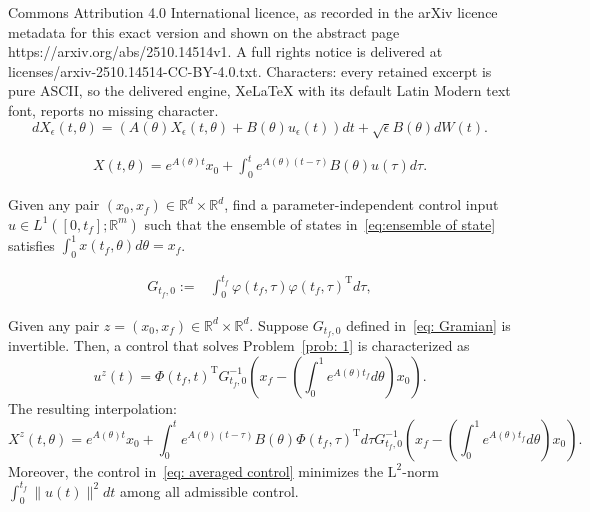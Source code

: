 \documentclass[10pt,a4paper]{amsart}
\newcommand{\R}{\mathbb{R}}
\begin{document}
Commons Attribution 4.0 International licence, as recorded in the arXiv licence metadata for this exact version and shown on the abstract page https://arxiv.org/abs/2510.14514v1. A full rights notice is delivered at licenses/arxiv-2510.14514-CC-BY-4.0.txt. Characters: every retained excerpt is pure ASCII, so the delivered engine, XeLaTeX with its default Latin Modern text font, reports no missing character.
\begin{equation}\label{eq:stochastic ensemble of systems}
d X_{\epsilon}(t,\theta)=(A(\theta)X_{\epsilon}(t,\theta)+B(\theta)u_{\epsilon}(t))d t+\sqrt{\epsilon}B(\theta)d W(t).
\end{equation}

\begin{align}\label{eq:ensemble of state}
X(t,\theta)=e^{A(\theta)t} x_0+\int_{0}^{t}e^{A(\theta)(t-\tau)}B(\theta)u(\tau)d\tau.
\end{align}

\begin{problem}\label{prob: 1}
Given any pair $(x_0,x_f)\in\R^d\times\R^d$, find a parameter-independent control input $u\in L^1([0,t_f];\mathbb{R}^m)$ such that the ensemble of states in~\eqref{eq:ensemble of state} satisfies $\int_{0}^{1} x(t_f,\theta)d\theta=x_f$.  
\end{problem}

\begin{align}\label{eq: Gramian}
G_{t_f,0}:=&\int_{0}^{t_f}\varphi(t_f,\tau)\varphi(t_f,\tau)^{\mathrm{T}}d\tau,
\end{align}

\begin{proposition}\label{prop: Interpolation of determinsstic case}
Given any pair $z=(x_0,x_f)\in\R^d\times\R^d$. Suppose $G_{t_f,0}$ defined in~\eqref{eq: Gramian} is invertible. Then, a control that solves Problem~\ref{prob: 1} is characterized as 
\begin{equation}\label{eq: averaged control}
u^z(t)=\Phi(t_f,t)^{\mathrm{T}} G_{t_f,0}^{-1}\left(x_f-\left(\int_{0}^{1}e^{A(\theta)t_f}d\theta\right) x_0\right).
\end{equation}
The resulting interpolation:
\begin{equation}\label{eq: Ensemble interpolation}
X^z(t,\theta)=e^{A(\theta)t} x_0+\int_{0}^{t}e^{A(\theta)(t-\tau)}B(\theta)\Phi(t_f,\tau)^{\mathrm{T}}d\tau G_{t_f,0}^{-1}\left(x_f-\left(\int_{0}^{1}e^{A(\theta)t_f}d\theta\right) x_0\right).   
\end{equation}
Moreover, the control in~\eqref{eq: averaged control} minimizes the $\mathrm{L}^2$-norm $\int_0^{t_f}\|u(t)\|^2dt$ among all admissible control.
\end{proposition}
\end{document}
